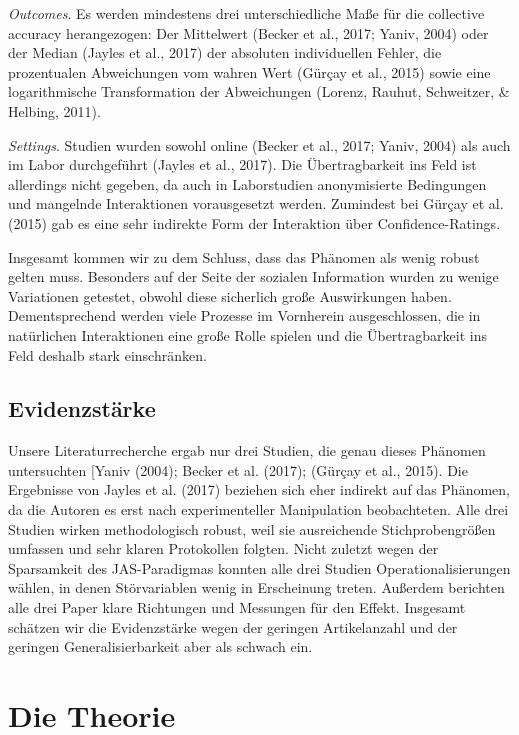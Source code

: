 \documentclass[
  man,mask,floatsintext]{apa6}
\begin{document}
\emph{Outcomes}. Es werden mindestens drei unterschiedliche Maße für die collective accuracy herangezogen: Der Mittelwert (Becker et al., 2017; Yaniv, 2004) oder der Median (Jayles et al., 2017) der absoluten individuellen Fehler, die prozentualen Abweichungen vom wahren Wert (Gürçay et al., 2015) sowie eine logarithmische Transformation der Abweichungen (Lorenz, Rauhut, Schweitzer, \& Helbing, 2011).

\emph{Settings}. Studien wurden sowohl online (Becker et al., 2017; Yaniv, 2004) als auch im Labor durchgeführt (Jayles et al., 2017). Die Übertragbarkeit ins Feld ist allerdings nicht gegeben, da auch in Laborstudien anonymisierte Bedingungen und mangelnde Interaktionen vorausgesetzt werden. Zumindest bei Gürçay et al. (2015) gab es eine sehr indirekte Form der Interaktion über Confidence-Ratings.

Insgesamt kommen wir zu dem Schluss, dass das Phänomen als wenig robust gelten muss. Besonders auf der Seite der sozialen Information wurden zu wenige Variationen getestet, obwohl diese sicherlich große Auswirkungen haben. Dementsprechend werden viele Prozesse im Vornherein ausgeschlossen, die in natürlichen Interaktionen eine große Rolle spielen und die Übertragbarkeit ins Feld deshalb stark einschränken.

\subsection{Evidenzstärke}\label{evidenzstuxe4rke}

Unsere Literaturrecherche ergab nur drei Studien, die genau dieses Phänomen untersuchten {[}Yaniv (2004); Becker et al. (2017); (Gürçay et al., 2015). Die Ergebnisse von Jayles et al. (2017) beziehen sich eher indirekt auf das Phänomen, da die Autoren es erst nach experimenteller Manipulation beobachteten. Alle drei Studien wirken methodologisch robust, weil sie ausreichende Stichprobengrößen umfassen und sehr klaren Protokollen folgten. Nicht zuletzt wegen der Sparsamkeit des JAS-Paradigmas konnten alle drei Studien Operationalisierungen wählen, in denen Störvariablen wenig in Erscheinung treten. Außerdem berichten alle drei Paper klare Richtungen und Messungen für den Effekt. Insgesamt schätzen wir die Evidenzstärke wegen der geringen Artikelanzahl und der geringen Generalisierbarkeit aber als schwach ein.

\section{Die Theorie}\label{die-theorie}
\end{document}
